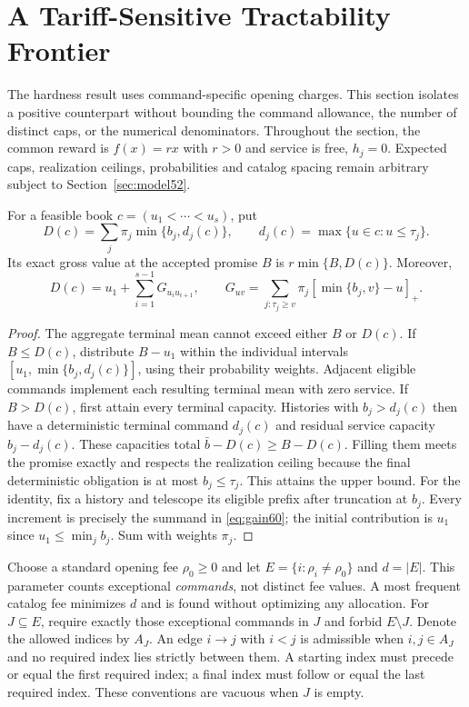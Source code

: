 \section{A Tariff-Sensitive Tractability Frontier}\label{sec:tariff60}
The hardness result uses command-specific opening charges. This section isolates a positive counterpart without bounding the command allowance, the number of distinct caps, or the numerical denominators. Throughout the section, the common reward is $f(x)=rx$ with $r>0$ and service is free, $h_j=0$. Expected caps, realization ceilings, probabilities and catalog spacing remain arbitrary subject to Section~\ref{sec:model52}.

\begin{lemma}\label{lem:capacity60}
For a feasible book $c=(u_1<\cdots<u_s)$, put
\[
 D(c)=\sum_j\pi_j\min\{b_j,d_j(c)\},\qquad
 d_j(c)=\max\{u\in c:u\leq\tau_j\}.
\]
Its exact gross value at the accepted promise $B$ is $r\min\{B,D(c)\}$. Moreover,
\begin{equation}\label{eq:gain60}
 D(c)=u_1+\sum_{i=1}^{s-1}G_{u_i u_{i+1}},\qquad
 G_{uv}=\sum_{j:\tau_j\geq v}\pi_j[\min\{b_j,v\}-u]_+.
\end{equation}
\end{lemma}
\begin{proof}
The aggregate terminal mean cannot exceed either $B$ or $D(c)$. If $B\leq D(c)$, distribute $B-u_1$ within the individual intervals $[u_1,\min\{b_j,d_j(c)\}]$, using their probability weights. Adjacent eligible commands implement each resulting terminal mean with zero service. If $B>D(c)$, first attain every terminal capacity. Histories with $b_j>d_j(c)$ then have a deterministic terminal command $d_j(c)$ and residual service capacity $b_j-d_j(c)$. These capacities total $\bar b-D(c)\geq B-D(c)$. Filling them meets the promise exactly and respects the realization ceiling because the final deterministic obligation is at most $b_j\leq\tau_j$. This attains the upper bound. For the identity, fix a history and telescope its eligible prefix after truncation at $b_j$. Every increment is precisely the summand in \eqref{eq:gain60}; the initial contribution is $u_1$ since $u_1\leq\min_j b_j$. Sum with weights $\pi_j$.
\end{proof}

Choose a standard opening fee $\rho_0\geq0$ and let $E=\{i:\rho_i\ne\rho_0\}$ and $d=|E|$. This parameter counts exceptional \emph{commands}, not distinct fee values. A most frequent catalog fee minimizes $d$ and is found without optimizing any allocation. For $J\subseteq E$, require exactly those exceptional commands in $J$ and forbid $E\setminus J$. Denote the allowed indices by $A_J$. An edge $i\to j$ with $i<j$ is admissible when $i,j\in A_J$ and no required index lies strictly between them. A starting index must precede or equal the first required index; a final index must follow or equal the last required index. These conventions are vacuous when $J$ is empty.

